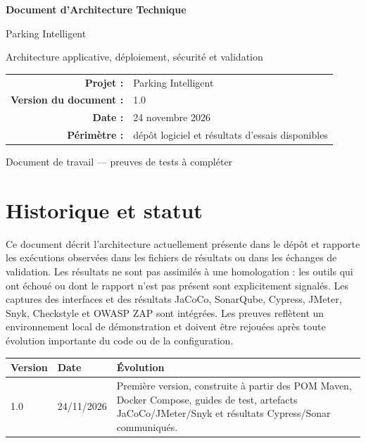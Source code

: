 \documentclass[11pt,a4paper]{report}
\begin{document}
\begin{titlepage}
  \centering
  \vspace*{2.0cm}
  {\Huge\bfseries\color{parkinggreen} Document d'Architecture Technique\par}
  \vspace{0.7cm}
  {\LARGE Parking Intelligent\par}
  \vspace{1.4cm}
  {\large Architecture applicative, déploiement, sécurité et validation\par}
  \vfill
  \begin{tabular}{rl}
    \textbf{Projet :} & Parking Intelligent \\
    \textbf{Version du document :} & 1.0 \\
    \textbf{Date :} & 24 novembre 2026 \\
    \textbf{Périmètre :} & dépôt logiciel et résultats d'essais disponibles \\
  \end{tabular}
  \vfill
  {\large Document de travail — preuves de tests à compléter\par}
\end{titlepage}

\tableofcontents
\clearpage

\chapter*{Historique et statut}
Ce document décrit l'architecture actuellement présente dans le dépôt et rapporte les exécutions observées dans les fichiers de résultats ou dans les échanges de validation. Les résultats ne sont pas assimilés à une homologation : les outils qui ont échoué ou dont le rapport n'est pas présent sont explicitement signalés. Les captures des interfaces et des résultats JaCoCo, SonarQube, Cypress, JMeter, Snyk, Checkstyle et OWASP ZAP sont intégrées. Les preuves reflètent un environnement local de démonstration et doivent être rejouées après toute évolution importante du code ou de la configuration.

\begin{longtable}{p{2.6cm}p{2.2cm}p{9.1cm}}
\toprule
\textbf{Version} & \textbf{Date} & \textbf{Évolution} \\
\midrule
1.0 & 24/11/2026 & Première version, construite à partir des POM Maven, Docker Compose, guides de test, artefacts JaCoCo/JMeter/Snyk et résultats Cypress/Sonar communiqués. \\
\bottomrule
\end{longtable}
\end{document}
